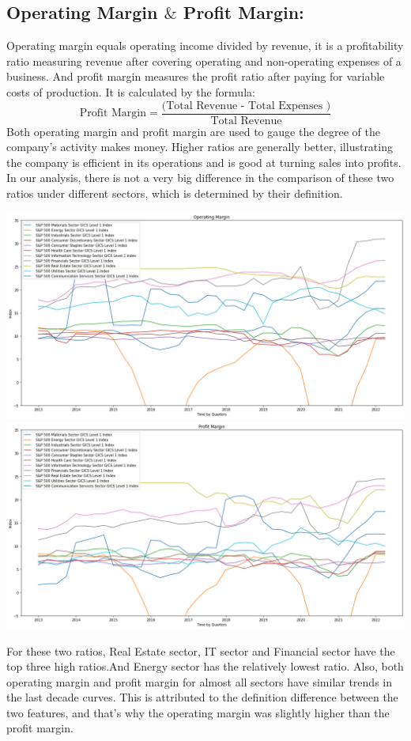 \documentclass{article}
\begin{document}
\subsection{Operating Margin $\&$ Profit Margin:}
Operating margin equals operating income divided by revenue, it is a profitability ratio measuring revenue after covering operating and non-operating expenses of a business. And profit margin measures the profit ratio after paying for variable costs of production. It is calculated by the formula: 
$$\text{Profit Margin} = \frac{(\text{Total Revenue - Total Expenses )}}{ \text{Total Revenue}}$$
Both operating margin and profit margin are used to gauge the degree of the company's activity makes money. Higher ratios are generally better, illustrating the company is efficient in its operations and is good at turning sales into profits. In our analysis, there is not a very big difference in the comparison of these two ratios under different sectors, which is determined by their definition.
\begin{center}
    \includegraphics[scale=0.4]{operating_margin.png}
    \includegraphics[scale=0.4]{profit_margin.png}
\end{center}
For these two ratios, Real Estate sector, IT sector and Financial sector have the top three high ratios.And Energy sector has the relatively lowest ratio. Also, both operating margin and profit margin for almost all sectors have similar trends in the last decade curves. This is attributed to the definition difference between the two features, and that's why the operating margin was slightly higher than the profit margin.\\
\end{document}
